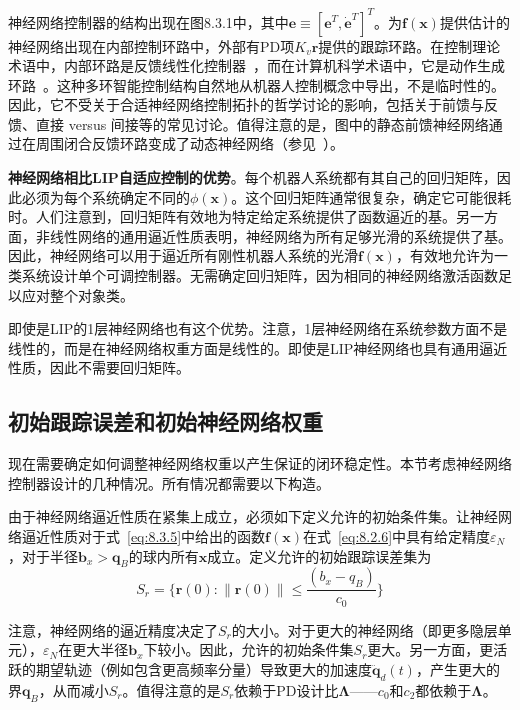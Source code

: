 \documentclass[12pt,a4paper]{ctexart}
\begin{document}
神经网络控制器的结构出现在图8.3.1中，其中$\bm{e} \equiv [\bm{e}^T, \dot{\bm{e}}^T]^T$。为$\bm{f}(\bm{x})$提供估计的神经网络出现在内部控制环路中，外部有PD项$K_v\bm{r}$提供的跟踪环路。在控制理论术语中，内部环路是反馈线性化控制器~\cite{slotine1991}，而在计算机科学术语中，它是动作生成环路~\cite{werbos1992,miller1991,white1992}。这种多环智能控制结构自然地从机器人控制概念中导出，不是临时性的。因此，它不受关于合适神经网络控制拓扑的哲学讨论的影响，包括关于前馈与反馈、直接 versus 间接等的常见讨论。值得注意的是，图中的静态前馈神经网络通过在周围闭合反馈环路变成了动态神经网络（参见~\cite{narendra1991}）。

\textbf{神经网络相比LIP自适应控制的优势}。每个机器人系统都有其自己的回归矩阵，因此必须为每个系统确定不同的$\phi(\bm{x})$。这个回归矩阵通常很复杂，确定它可能很耗时。人们注意到，回归矩阵有效地为特定给定系统提供了函数逼近的基。另一方面，非线性网络的通用逼近性质表明，神经网络为所有足够光滑的系统提供了基。因此，神经网络可以用于逼近所有刚性机器人系统的光滑$\bm{f}(\bm{x})$，有效地允许为一类系统设计单个可调控制器。无需确定回归矩阵，因为相同的神经网络激活函数足以应对整个对象类。

即使是LIP的1层神经网络也有这个优势。注意，1层神经网络在系统参数方面不是线性的，而是在神经网络权重方面是线性的。即使是LIP神经网络也具有通用逼近性质，因此不需要回归矩阵。

\subsection{初始跟踪误差和初始神经网络权重}

现在需要确定如何调整神经网络权重以产生保证的闭环稳定性。本节考虑神经网络控制器设计的几种情况。所有情况都需要以下构造。

由于神经网络逼近性质在紧集上成立，必须如下定义允许的初始条件集。让神经网络逼近性质对于式~\eqref{eq:8.3.5}中给出的函数$\bm{f}(\bm{x})$在式~\eqref{eq:8.2.6}中具有给定精度$\varepsilon_N$，对于半径$\bm{b}_x > \bm{q}_B$的球内所有$\bm{x}$成立。定义允许的初始跟踪误差集为
\begin{equation}\label{eq:8.3.15}
S_r = \{\bm{r}(0): \|\bm{r}(0)\| \leq \frac{(b_x - q_B)}{c_0}\}
\end{equation}

注意，神经网络的逼近精度决定了$S_r$的大小。对于更大的神经网络（即更多隐层单元），$\varepsilon_N$在更大半径$\bm{b}_x$下较小。因此，允许的初始条件集$S_r$更大。另一方面，更活跃的期望轨迹（例如包含更高频率分量）导致更大的加速度$\ddot{\bm{q}}_d(t)$，产生更大的界$\bm{q}_B$，从而减小$S_r$。值得注意的是$S_r$依赖于PD设计比$\bm{\Lambda}$——$c_0$和$c_2$都依赖于$\bm{\Lambda}$。
\end{document}
